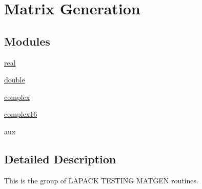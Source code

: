 \hypertarget{group__matgen}{}\section{Matrix Generation}
\label{group__matgen}
\subsection*{Modules}
\begin{DoxyCompactItemize}
\item 
\hyperlink{group__real__matgen}{real}
\item 
\hyperlink{group__double__matgen}{double}
\item 
\hyperlink{group__complex__matgen}{complex}
\item 
\hyperlink{group__complex16__matgen}{complex16}
\item 
\hyperlink{group__aux__matgen}{aux}
\end{DoxyCompactItemize}


\subsection{Detailed Description}
This is the group of L\+A\+P\+A\+C\+K T\+E\+S\+T\+I\+N\+G M\+A\+T\+G\+E\+N routines. 